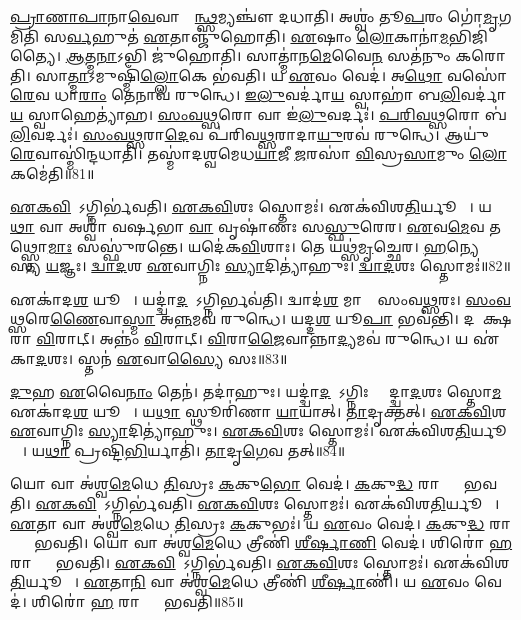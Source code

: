 \ul{𑌪𑍍𑌰𑌾}\ul{𑌣𑌾}\ul{𑌪𑌾}𑌨𑌾\ul{𑌵𑍇}𑌵𑌾𑌸𑍍𑌮𑌿᳚\ul{𑌨𑍍𑌥𑍍𑌸}𑌮𑍍𑌯𑌞𑍍𑌚𑍗॑ 𑌦𑌧𑌾𑌤𑌿।
𑌅𑌶𑍍𑌵𑌂॑ 𑌤𑍂\ul{𑌪}𑌰𑌂 𑌗𑍋॑\ul{𑌮𑍃}𑌗𑌮𑌿𑌤𑌿॑ 𑌸\ul{𑌰𑍍𑌵}𑌹𑍁𑌤॑ \ul{𑌏}𑌤𑌾𑌞𑍍𑌜𑍁॑𑌹𑍋𑌤𑌿।
\ul{𑌏}𑌷𑌾𑌂 \ul{𑌲𑍋}𑌕𑌾𑌨𑌾॑\ul{𑌮}𑌭𑌿𑌜𑌿॑𑌤𑍍𑌯𑍈।
\ul{𑌆}𑌤𑍍𑌮\ul{𑌨𑌾}𑌽𑌭𑌿 𑌜𑍁॑𑌹𑍋𑌤𑌿।
𑌸𑌾𑌤𑍍𑌮𑌾॑𑌨\ul{𑌮𑍇}𑌵𑍈\ul{𑌨}\ul{} 𑌸𑌤॑𑌨𑍁𑌂 𑌕𑌰𑍋𑌤𑌿।
𑌸𑌾\ul{𑌤𑍍𑌮𑌾}\-𑌽𑌮𑍁𑌷𑍍𑌮𑌿𑌁॑\ul{𑌲𑍍𑌲𑍋}𑌕𑍇 𑌭॑𑌵𑌤𑌿।
𑌯 \ul{𑌏}𑌵𑌂 𑌵𑍇𑌦॑।
𑌅\ul{𑌥𑍋} 𑌵𑌸𑍋॑\ul{𑌰𑍇}𑌵 𑌧𑌾\ul{𑌰𑌾𑌂} 𑌤𑍇𑌨𑌾𑌵॑ 𑌰𑍁𑌨𑍍𑌧𑍇।
\ul{𑌇}\ul{𑌲𑍁}𑌵𑌰𑍍𑌦𑌾॑\ul{𑌯} 𑌸𑍍𑌵𑌾𑌹𑌾॑ 𑌬\ul{𑌲𑌿}𑌵𑌰𑍍𑌦𑌾॑\ul{𑌯} 𑌸𑍍𑌵𑌾𑌹𑍇𑌤𑍍𑌯𑌾॑𑌹।
\ul{𑌸𑌂}\ul{𑌵}\ul{𑌥𑍍𑌸}𑌰𑍋 𑌵𑌾 𑌇॑\ul{𑌲𑍁}𑌵𑌰𑍍𑌦𑌃॑।
\ul{𑌪}\ul{𑌰𑌿}\ul{𑌵}\ul{𑌥𑍍𑌸}𑌰𑍋 𑌬॑\ul{𑌲𑌿}𑌵𑌰𑍍𑌦𑌃॑।
\ul{𑌸𑌂}\ul{𑌵}\ul{𑌥𑍍𑌸}𑌰𑌾\ul{𑌦𑍇}𑌵 𑌪॑𑌰𑌿𑌵\ul{𑌥𑍍𑌸}𑌰𑌾𑌦𑌾\ul{𑌯𑍁}𑌰𑌵॑ 𑌰𑍁𑌨𑍍𑌧𑍇।
𑌆𑌯𑍁॑\ul{𑌰𑍇}𑌵𑌾𑌸𑍍𑌮𑌿॑𑌨𑍍𑌦𑌧𑌾𑌤𑌿।
𑌤𑌸𑍍𑌮𑌾॑𑌦𑌶𑍍𑌵𑌮𑍇𑌧\ul{𑌯𑌾}𑌜𑍀 \ul{𑌜}𑌰𑌸𑌾॑ \ul{𑌵𑌿}𑌸𑍍𑌰\ul{𑌸𑌾}𑌮𑍁𑌂 \ul{𑌲𑍋}𑌕𑌮𑍇॑𑌤𑌿॥81॥\anuvakamend[𑌤𑍇\ul{𑌜}𑌸𑍋\-𑌽𑌵॑𑌰𑍁𑌦𑍍𑌧𑍍𑌯𑍈 𑌭\ul{𑌵}𑌨𑍍𑌤𑍍𑌯𑌶𑍍𑌵𑍋॑ 𑌗𑍋\ul{𑌮𑍃}𑌗𑌮𑌿॑\ul{𑌲𑍁}𑌵𑌰𑍍𑌦॑\ul{𑌶𑍍𑌚}𑌤𑍍𑌵𑌾𑌰𑌿॑ 𑌚]

\ul{𑌏}\ul{𑌕}\ul{𑌵𑌿}\ul{}𑌶𑍋᳚\-𑌽𑌗𑍍𑌨𑌿𑌰𑍍𑌭॑𑌵𑌤𑌿।
\ul{𑌏}\ul{𑌕}\ul{𑌵𑌿}\ul{}𑌶𑌃 𑌸𑍍𑌤𑍋𑌮𑌃॑।
𑌏𑌕॑\-𑌵𑌿𑌶\ul{𑌤𑌿}𑌰𑍍𑌯𑍂𑌪𑌾𑌃᳚।
𑌯\ul{𑌥𑌾} 𑌵𑌾 𑌅𑌶𑍍𑌵𑌾॑ 𑌵𑌰𑍍\mbox{}\ul{𑌷}𑌭𑌾 \ul{𑌵𑌾} 𑌵𑍃𑌷𑌾॑𑌣𑌃 𑌸\ul{𑌸𑍍𑌫𑍁}𑌰𑍇𑌰\sn{}।
\ul{𑌏}𑌵\ul{𑌮𑍇}𑌵 𑌤𑌥𑍍𑌸𑍍𑌤𑍋\ul{𑌮𑌾𑌃} 𑌸𑌸𑍍𑌫𑍁॑𑌰𑌨𑍍𑌤𑍇।
𑌯𑌦𑍇॑𑌕\ul{𑌵𑌿}\ul{}𑌶𑌾𑌃।
𑌤𑍇 𑌯𑌥𑍍𑌸॑\ul{𑌮𑍃}𑌚𑍍𑌛𑍇𑌰\sn{}।
\ul{𑌹}𑌨𑍍𑌯𑍇𑌤𑌾᳚𑌸𑍍𑌯 \ul{𑌯}𑌜𑍍𑌞𑌃।
\ul{𑌦𑍍𑌵𑌾}\ul{𑌦}𑌶 \ul{𑌏}𑌵𑌾𑌗𑍍𑌨𑌿𑌃 \ul{𑌸𑍍𑌯𑌾}𑌦𑌿𑌤𑍍𑌯𑌾॑𑌹𑍁𑌃।
\ul{𑌦𑍍𑌵𑌾}\ul{𑌦}𑌶𑌃 𑌸𑍍𑌤𑍋𑌮𑌃॑॥82॥

𑌏𑌕𑌾॑𑌦\ul{𑌶} 𑌯𑍂𑌪𑌾𑌃᳚।
𑌯𑌦𑍍𑌦𑍍𑌵𑌾॑\ul{𑌦}𑌶𑍋᳚\-𑌽𑌗𑍍𑌨𑌿𑌰𑍍𑌭𑌵॑𑌤𑌿।
𑌦𑍍𑌵𑌾𑌦॑\ul{𑌶} 𑌮𑌾𑌸𑌾𑌃᳚ 𑌸𑌂𑌵\ul{𑌥𑍍𑌸}𑌰𑌃।
\ul{𑌸𑌂}\ul{𑌵}\ul{𑌥𑍍𑌸}𑌰𑍇\ul{𑌣𑍈}𑌵𑌾\ul{𑌸𑍍𑌮𑌾} 𑌅\ul{𑌨𑍍𑌨}𑌮𑌵॑ 𑌰𑍁𑌨𑍍𑌧𑍇।
𑌯𑌦𑍍𑌦\ul{𑌶} 𑌯𑍂\ul{𑌪𑌾} 𑌭𑌵॑𑌨𑍍𑌤𑌿।
𑌦𑌶𑌾᳚𑌕𑍍𑌷𑌰𑌾 \ul{𑌵𑌿}𑌰𑌾𑌟𑍍।
𑌅𑌨𑍍𑌨𑌂॑ \ul{𑌵𑌿}𑌰𑌾𑌟𑍍।
\ul{𑌵𑌿}𑌰𑌾\ul{𑌜𑍈}𑌵𑌾𑌨𑍍𑌨𑌾\ul{𑌦𑍍𑌯}𑌮𑌵॑ 𑌰𑍁𑌨𑍍𑌧𑍇।
𑌯 𑌏॑𑌕𑌾\ul{𑌦}𑌶𑌃।
𑌸𑍍𑌤𑌨॑ \ul{𑌏}𑌵𑌾\ul{𑌸𑍍𑌯𑍈} 𑌸𑌃॥83॥

\ul{𑌦𑍁}𑌹 \ul{𑌏}𑌵𑍈\ul{𑌨𑌾𑌂} 𑌤𑍇𑌨॑।
𑌤𑌦𑌾॑𑌹𑍁𑌃।
𑌯𑌦𑍍𑌦𑍍𑌵𑌾॑\ul{𑌦}𑌶𑍋᳚\-𑌽𑌗𑍍𑌨𑌿𑌃 𑌸𑍍𑌯𑌾᳚𑌦𑍍𑌦𑍍𑌵𑌾\ul{𑌦}𑌶𑌃 𑌸𑍍𑌤𑍋\ul{𑌮} 𑌏𑌕𑌾॑𑌦\ul{𑌶} 𑌯𑍂𑌪𑌾𑌃᳚।
𑌯\ul{𑌥𑌾} 𑌸𑍍𑌥𑍂𑌰𑌿॑𑌣𑌾 \ul{𑌯𑌾}𑌯𑌾𑌤𑍍।
\ul{𑌤𑌾}𑌦𑍃𑌕𑍍𑌤𑌤𑍍।
\ul{𑌏}\ul{𑌕}\ul{𑌵𑌿}\ul{}𑌶 \ul{𑌏}𑌵𑌾𑌗𑍍𑌨𑌿𑌃 \ul{𑌸𑍍𑌯𑌾}𑌦𑌿𑌤𑍍𑌯𑌾॑𑌹𑍁𑌃।
\ul{𑌏}\ul{𑌕}\ul{𑌵𑌿}\ul{}𑌶𑌃 𑌸𑍍𑌤𑍋𑌮𑌃॑।
𑌏𑌕॑𑌵𑌿𑌶\ul{𑌤𑌿}𑌰𑍍𑌯𑍂𑌪𑌾𑌃᳚।
𑌯\ul{𑌥𑌾} 𑌪𑍍𑌰𑌷𑍍𑌟𑌿॑\ul{𑌭𑌿}𑌰𑍍𑌯𑌾𑌤𑌿॑।
\ul{𑌤𑌾}𑌦𑍃\ul{𑌗𑍇}𑌵 𑌤𑌤𑍍॥84॥

𑌯𑍋 𑌵𑌾 𑌅॑𑌶𑍍𑌵\ul{𑌮𑍇}𑌧𑍇 \ul{𑌤𑌿}𑌸𑍍𑌰𑌃 \ul{𑌕}𑌕𑍁\ul{𑌭𑍋} 𑌵𑍇𑌦॑।
\ul{𑌕}𑌕𑍁\ul{𑌦𑍍𑌧} 𑌰𑌾𑌜𑍍𑌞𑌾𑌂᳚ 𑌭𑌵𑌤𑌿।
\ul{𑌏}\ul{𑌕}\ul{𑌵𑌿}\ul{}𑌶𑍋᳚\-𑌽𑌗𑍍𑌨𑌿𑌰𑍍𑌭॑𑌵𑌤𑌿।
\ul{𑌏}\ul{𑌕}\ul{𑌵𑌿}\ul{}𑌶𑌃 𑌸𑍍𑌤𑍋𑌮𑌃॑।
𑌏𑌕॑𑌵𑌿𑌶\ul{𑌤𑌿}𑌰𑍍𑌯𑍂𑌪𑌾𑌃᳚।
\ul{𑌏}𑌤𑌾 𑌵𑌾 𑌅॑𑌶𑍍𑌵\ul{𑌮𑍇}𑌧𑍇 \ul{𑌤𑌿}𑌸𑍍𑌰𑌃 \ul{𑌕}𑌕𑍁𑌭𑌃॑।
𑌯 \ul{𑌏}𑌵𑌂 𑌵𑍇𑌦॑।
\ul{𑌕}𑌕𑍁\ul{𑌦𑍍𑌧} 𑌰𑌾𑌜𑍍𑌞𑌾𑌂᳚ 𑌭𑌵𑌤𑌿।
𑌯𑍋 𑌵𑌾 𑌅॑𑌶𑍍𑌵\ul{𑌮𑍇}𑌧𑍇 𑌤𑍍𑌰𑍀𑌣𑌿॑ \ul{𑌶𑍀}\ul{𑌰𑍍}𑌷𑌾\ul{𑌣𑌿} 𑌵𑍇𑌦॑।
𑌶𑌿𑌰𑍋॑ \ul{𑌹} 𑌰𑌾𑌜𑍍𑌞𑌾𑌂᳚ 𑌭𑌵𑌤𑌿।
\ul{𑌏}\ul{𑌕}\ul{𑌵𑌿}\ul{}𑌶𑍋᳚\-𑌽𑌗𑍍𑌨𑌿𑌰𑍍𑌭॑𑌵𑌤𑌿।
\ul{𑌏}\ul{𑌕}\ul{𑌵𑌿}\ul{}𑌶𑌃 𑌸𑍍𑌤𑍋𑌮𑌃॑।
𑌏𑌕॑𑌵𑌿𑌶\ul{𑌤𑌿}𑌰𑍍𑌯𑍂𑌪𑌾𑌃᳚।
\ul{𑌏}𑌤𑌾\ul{𑌨𑌿} 𑌵𑌾 𑌅॑𑌶𑍍𑌵\ul{𑌮𑍇}𑌧𑍇 𑌤𑍍𑌰𑍀𑌣𑌿॑ \ul{𑌶𑍀}\ul{𑌰𑍍}𑌷𑌾𑌣𑌿॑।
𑌯 \ul{𑌏}𑌵𑌂 𑌵𑍇𑌦॑।
𑌶𑌿𑌰𑍋॑ \ul{𑌹} 𑌰𑌾𑌜𑍍𑌞𑌾𑌂᳚ 𑌭𑌵𑌤𑌿॥85॥\anuvakamend[\ul{𑌦𑍍𑌵𑌾}\ul{𑌦}𑌶𑌃 𑌸𑍍𑌤𑍋\ul{𑌮𑌃} 𑌸 \ul{𑌏}𑌵 𑌤𑌚𑍍𑌛𑌿𑌰𑍋॑ \ul{𑌹} 𑌰𑌾𑌜𑍍𑌞𑌾𑌂᳚ 𑌭𑌵\ul{𑌤𑌿} 𑌷𑌟𑍍 𑌚॑]

